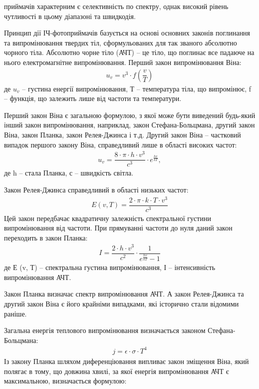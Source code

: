\documentclass[a4paper,14pt]{extreport}
\begin{document}
  приймачів характерним є селективність по спектру, однак високий рівень
  чутливості в цьому діапазоні та швидкодія.\par
  Принцип дії ІЧ-фотоприймачів базується на основі основних законів
  поглинання та випромінювання твердих тіл, сформульованих для так званого
  абсолютно чорного тіла. Абсолютно чорне тіло (АЧТ) – це тіло, що поглинає все
  падаюче на нього електромагнітне випромінювання. Перший закон
  випромінювання Віна:
  \begin{align}
   u_v = v^3\cdot f \left( \dfrac{v}{T} \right) 
  \end{align}
  де $u_v$ – густина енергії випромінювання, Т –
  температура тіла, що випромінює, f – функція, що залежить лише від частоти та
  температури.\par
  Перший закон Віна є загальною формулою, з якої може бути виведений
  будь-який інший закон випромінювання, наприклад, закон Стефана-Больцмана,
  другий закон Віна, закон Планка, закон Релея-Джинса і т.д.
  Другий закон Віна – частковий випадок першого закону Віна, справедливий
  лише в області високих частот:
  \begin{align}
   u_v = \dfrac{8\cdot \pi\cdot h\cdot v^3}{c^3}\cdot e^{\frac{hv}{kT}},
  \end{align}
  де h – стала Планка, с – швидкість світла.\par
  Закон Релея-Джинса справедливий в області низьких частот:
  \begin{align}
  E(v,T)=\dfrac{2\cdot\pi\cdot k \cdot T \cdot v^3 }{c^3}
  \end{align}
  Цей закон передбачає квадратичну залежність спектральної густини
  випромінювання від частоти. При прямуванні частоти до нуля даний закон
  переходить в закон Планка:
  \begin{align}
  I = \dfrac{2\cdot h \cdot v^3}{c^2}\cdot \dfrac{1}{e^{\frac{hv}{kT}}-1} 
  \end{align}
  де Е (v, Т) – спектральна густина випромінювання, І – інтенсивність випромінювання АЧТ.\par
  Закон Планка визначає спектр випромінювання АЧТ. А закон Релея-Джинса та другий закон Віна є його крайніми випадками, які історично стали відомими раніше.\par
  Загальна енергія теплового випромінювання визначається законом Стефана-Больцмана:
  \begin{align}
  j = \epsilon \cdot \sigma \cdot T^4
  \end{align}
  Із закону Планка шляхом диференціювання випливає закон зміщення Віна, який полягає в тому, що довжина хвилі, за якої енергія випромінювання АЧТ є максимальною, визначається формулою:
\end{document}
